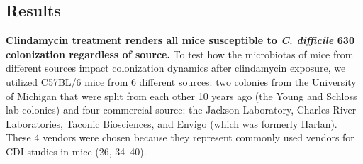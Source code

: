 \documentclass[11pt,]{article}
\begin{document}
\subsection{Results}\label{results}

\textbf{Clindamycin treatment renders all mice susceptible to \emph{C.
difficile} 630 colonization regardless of source.} To test how the
microbiotas of mice from different sources impact colonization dynamics
after clindamycin exposure, we utilized C57BL/6 mice from 6 different
sources: two colonies from the University of Michigan that were split
from each other 10 years ago (the Young and Schloss lab colonies) and
four commercial source: the Jackson Laboratory, Charles River
Laboratories, Taconic Biosciences, and Envigo (which was formerly
Harlan). These 4 vendors were chosen because they represent commonly
used vendors for CDI studies in mice (26, 34--40).
\end{document}
